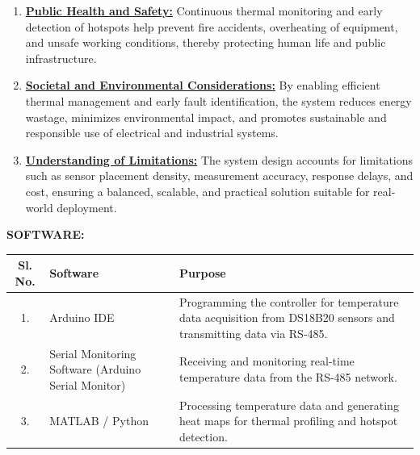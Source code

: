 \documentclass[12pt,a4paper]{article}
\begin{document}
\begin{enumerate}

\item \textbf{\underline{Public Health and Safety:}} Continuous thermal monitoring and early detection of hotspots help prevent fire accidents, overheating of equipment, and unsafe working conditions, thereby protecting human life and public infrastructure.

\vspace{8pt}

\item \textbf{\underline{Societal and Environmental Considerations:}} By enabling efficient thermal management and early fault identification, the system reduces energy wastage, minimizes environmental impact, and promotes sustainable and responsible use of electrical and industrial systems.

\vspace{8pt}

\item \textbf{\underline{Understanding of Limitations:}} The system design accounts for limitations such as sensor placement density, measurement accuracy, response delays, and cost, ensuring a balanced, scalable, and practical solution suitable for real-world deployment.

\end{enumerate}

\vspace{12pt}
\newpage
\noindent
\textbf{SOFTWARE:}

\vspace{8pt}

\begin{table}[H]
\centering
\begin{tabular}{|c|l|p{6cm}|}
\hline
\textbf{Sl. No.} & \textbf{Software} & \textbf{Purpose} \\
\hline
1. & Arduino IDE & Programming the controller for temperature data acquisition from DS18B20 sensors and transmitting data via RS-485. \\
\hline
2. & Serial Monitoring Software (Arduino Serial Monitor) & Receiving and monitoring real-time temperature data from the RS-485 network. \\
\hline
3. & MATLAB / Python & Processing temperature data and generating heat maps for thermal profiling and hotspot detection. \\
\hline
\end{tabular}
\end{table}
\end{document}
